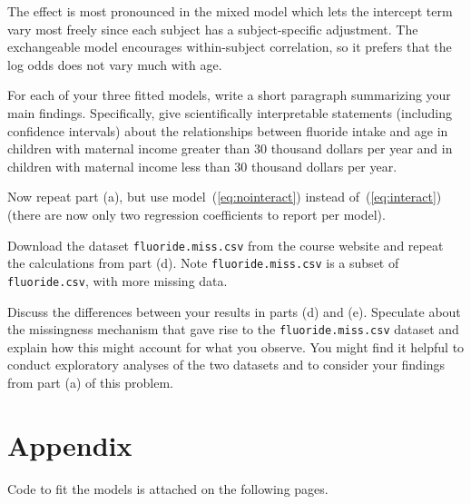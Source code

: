 \documentclass[11pt, letterpaper]{article}
\begin{document}
\begin{enumerate}[(a)]
\begin{description}
  The effect is most pronounced in the mixed model which lets the intercept term
  vary most freely since each subject has a subject-specific adjustment. The
  exchangeable model encourages within-subject correlation, so it prefers that
  the log odds does not vary much with age.
\end{description}
{\em \item For each of your three fitted models, write a short paragraph summarizing your main findings.  Specifically, give scientifically interpretable statements (including confidence intervals) about the relationships between fluoride intake and age
in children with maternal income greater than 30 thousand dollars per year and
in children with maternal income less than 30 thousand dollars per year.}
{\em \item Now repeat part (a), but use model~(\ref{eq:nointeract}) instead of~(\ref{eq:interact}) (there are now only two regression coefficients to report per model).}
{\em \item Download the dataset \texttt{fluoride.miss.csv} from the course website and repeat the calculations from part (d).  Note \texttt{fluoride.miss.csv} is a subset of \texttt{fluoride.csv}, with more missing data.}
{\em \item  Discuss the differences between your results in parts (d) and (e).  Speculate
about the missingness mechanism that gave rise to the \texttt{fluoride.miss.csv} dataset and 
explain how this might account for what you observe.  You might find it
helpful to conduct exploratory analyses of the two datasets and to consider your findings from part (a) of
this problem.
}

\end{enumerate}


\FloatBarrier

\section*{Appendix}

Code to fit the models is attached on the following pages.


\end{document}
